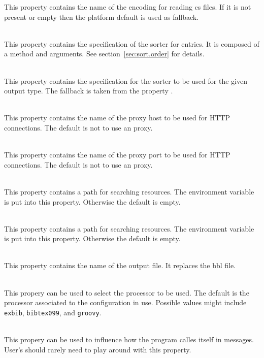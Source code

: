 \begin{description}
  This property contains the name of the encoding for reading cs
  files. If it is not present or empty then the platform default is
  used as fallback.
\item[\Property{exbib.sort}] \ \\
  This property contains the specification of the sorter for entries.
  It is composed of a method and arguments. See
  section~\ref{sec:sort.order} for details.
\item[\property{exbib.sort.\protect\Arg{type}}{exbib.sort.type}] \ \\
  This property contains the specification for the sorter to be used
  for the given output type. The fallback is taken from the property
  .
\item[\Property{http.proxyHost}] \ \\
  This property contains the name of the proxy host to be used for
  HTTP connections. The default is not to use an proxy.
\item[\Property{http.proxyPort}] \ \\
  This property contains the name of the proxy port to be used for
  HTTP connections. The default is not to use an proxy.
\item[\Property{texinputs}] \ \\
  This property contains a path for searching resources. The
  environment variable  is put into this property.
  Otherwise the default is empty.
\item[\Property{extex.texinputs}]  \ \\
  This property contains a path for searching resources. The
  environment variable  is put into this property.
  Otherwise the default is empty.
\item[\Property{exbib.output}] \ \\
  This property contains the name of the output file. It replaces the
  bbl file.
\item[\Property{exbib.processor}] \ \\
  This propery can be used to select the processor to be used. The
  default is the processor associated to the configuration in use.
  Possible values might include \texttt{exbib}, \texttt{bibtex099},
  and \texttt{groovy}.
\item[\Property{program.name}] \ \\
  This propery can be used to influence how the program calles itself
  in messages. User's should rarely need to play around with this
  property.
\end{description}

